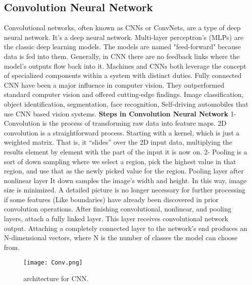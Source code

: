 \documentclass{ieeeaccess}
\begin{document}
\subsection{Convolution Neural Network}
Convolutional networks, often known as CNNs or ConvNets, are a type of deep neural network. It's a deep neural network. Multi-layer perceptron’s (MLPs) are the classic deep learning models. The models are named "feed-forward" because data is fed into them. Generally, in CNN there are no feedback links where the model's outputs flow back into it.
Machines and CNNs both leverage the concept of specialized components within a system with distinct duties.
Fully connected CNN have been a major influence in computer vision. They outperformed standard computer vision and offered cutting-edge findings. Image classification, object identification, segmentation, face recognition, Self-driving automobiles that use CNN based vision systems. 
\textbf{Steps in Convolution Neural Network}
1- Convolution is the process of transforming raw data into feature maps. 2D convolution is a straightforward process. Starting with a kernel, which is just a weighted matrix. That is, it “slides” over the 2D input data, multiplying the results element by element with the part of the input it is now on.
2-	Pooling is a sort of down sampling where we select a region, pick the highest value in that region, and use that as the newly picked value for the region. Pooling layer after nonlinear layer It down samples the image's width and height. In this way, image size is minimized. A detailed picture is no longer necessary for further processing if some features (Like boundaries) have already been discovered in prior convolution operations. After finishing convolutional, nonlinear, and pooling layers, attach a fully linked layer. This layer receives convolutional network output. Attaching a completely connected layer to the network's end produces an N-dimensional vectors, where N is the number of classes the model can choose from.

\begin{figure}[h]
\centering
\texttt{[image: Conv.png]}
\caption{architecture for CNN.}
\end{figure}
\end{document}
